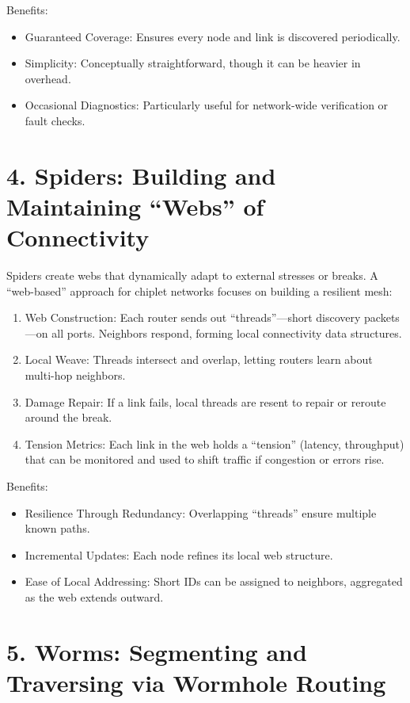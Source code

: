 \documentclass[../OAE-SPEC-MAIN.tex]{subfiles}
\begin{document}
Benefits:
\begin{itemize}
	\item Guaranteed Coverage: Ensures every node and link is discovered periodically.
	\item Simplicity: Conceptually straightforward, though it can be heavier in overhead.
	\item Occasional Diagnostics: Particularly useful for network-wide verification or fault checks.
\end{itemize}

\section{4. Spiders: Building and Maintaining “Webs” of Connectivity}

Spiders create webs that dynamically adapt to external stresses or breaks. A “web-based” approach for chiplet networks focuses on building a resilient mesh:

\begin{enumerate}
	\item  	Web Construction: Each router sends out “threads”—short discovery packets—on all ports. Neighbors respond, forming local connectivity data structures.
	\item  	Local Weave: Threads intersect and overlap, letting routers learn about multi-hop neighbors.
	\item  	Damage Repair: If a link fails, local threads are resent to repair or reroute around the break.
	\item  Tension Metrics: Each link in the web holds a “tension” (latency, throughput) that can be monitored and used to shift traffic if congestion or errors rise.
\end{enumerate}

Benefits:
\begin{itemize}
	\item Resilience Through Redundancy: Overlapping “threads” ensure multiple known paths.
	\item Incremental Updates: Each node refines its local web structure.
	\item Ease of Local Addressing: Short IDs can be assigned to neighbors, aggregated as the web extends outward.
\end{itemize}

\section{5. Worms: Segmenting and Traversing via Wormhole Routing}
\end{document}
